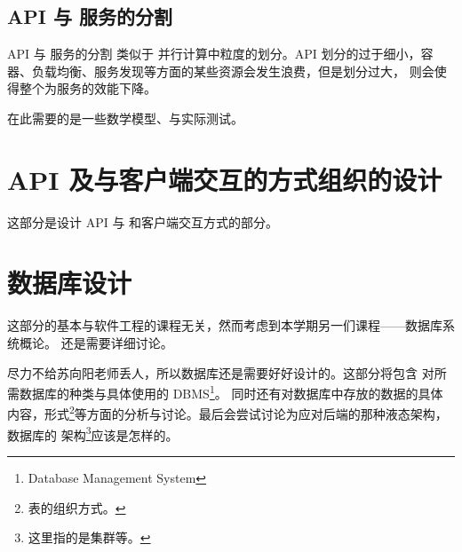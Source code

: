 \subsection{API 与 服务的分割}
API 与 服务的分割 类似于 并行计算中粒度的划分。API 划分的过于细小，容器、负载均衡、服务发现等方面的某些资源会发生浪费，但是划分过大，
则会使得整个为服务的效能下降。

在此需要的是一些数学模型、与实际测试。

\section{API 及与客户端交互的方式组织的设计}
这部分是设计 API 与 和客户端交互方式的部分。
\section{数据库设计}
这部分的基本与软件工程的课程无关，然而考虑到本学期另一们课程——数据库系统概论。
还是需要详细讨论。

尽力不给苏向阳老师丢人，所以数据库还是需要好好设计的。这部分将包含 对所需数据库的种类与具体使用的 DBMS\footnote{Database Management System}。
同时还有对数据库中存放的数据的具体内容，形式\footnote{表的组织方式。}等方面的分析与讨论。最后会尝试讨论为应对后端的那种液态架构，数据库的
架构\footnote{这里指的是集群等。}应该是怎样的。
